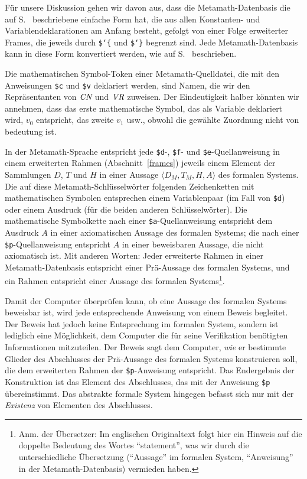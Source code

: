Für unsere Diskussion gehen wir davon aus, dass die Metamath-Datenbasis die auf S.~\pageref{framelist} beschriebene einfache Form hat, die aus allen Konstanten- und Variablendeklarationen am Anfang besteht, gefolgt von einer Folge erweiterter Frames, die jeweils durch \texttt{\$\char`\{} und \texttt{\$\char`\}} begrenzt sind.  Jede Metamath-Datenbasis kann in diese Form konvertiert werden, wie auf S.~\pageref{frameconvert} beschrieben. 

Die mathematischen Symbol-Token einer Metamath-Quelldatei, die mit den Anweisungen \texttt{\$c} und \texttt{\$v} deklariert werden, sind Namen, die wir den Repräsentanten von $\mbox{\em CN}$ und $\mbox{\em VR}$ zuweisen.  Der Eindeutigkeit halber könnten wir annehmen, dass das erste mathematische Symbol, das als Variable deklariert wird, $v_0$ entspricht, das zweite $v_1$ usw., obwohl die gewählte Zuordnung nicht von bedeutung ist. 

In der Metamath-Sprache entspricht jede \texttt{\$d}-, \texttt{\$f}- und \texttt{\$e}-Quellanweisung in einem erweiterten Rahmen (Abschnitt~\ref{frames}) jeweils einem Element der Sammlungen $D$, $T$ und $H$ in einer Aussage  $\langle D_M,T_M,H,A\rangle$ des formalen Systems.  Die auf diese Metamath-Schlüsselwörter folgenden Zeichenketten mit mathematischen Symbolen entsprechen einem Variablenpaar (im Fall von \texttt{\$d}) oder einem Ausdruck (für die beiden anderen Schlüsselwörter). Die mathematische Symbolkette nach einer \texttt{\$a}-Quellanweisung entspricht dem Ausdruck $A$ in einer axiomatischen Aussage des formalen Systems; die nach einer \texttt{\$p}-Quellanweisung entspricht $A$ in einer beweisbaren Aussage, die nicht axiomatisch ist.  Mit anderen Worten: Jeder erweiterte Rahmen in einer Metamath-Datenbasis entspricht einer Prä-Aussage des formalen Systems, und ein Rahmen entspricht einer Aussage des formalen Systems\footnote{Anm. der Übersetzer: Im englischen Originaltext folgt hier ein Hinweis auf die doppelte Bedeutung des Wortes "`statement"', was wir durch die unterschiedliche Übersetzung ("`Aussage"' im formalen System, "`Anweisung"' in der Metamath-Datenbasis) vermieden haben.}.  

Damit der Computer überprüfen kann, ob eine Aussage des formalen Systems beweisbar ist, wird jede entsprechende Anweisung von einem Beweis begleitet. Der Beweis hat jedoch keine Entsprechung im formalen System, sondern ist lediglich eine Möglichkeit, dem Computer die für seine Verifikation benötigten Informationen mitzuteilen.  Der Beweis sagt dem Computer, {\em wie} er bestimmte Glieder des Abschlusses der Prä-Aussage des formalen Systems konstruieren soll, die dem erweiterten Rahmen der \texttt{\$p}-Anweisung entspricht.  Das Endergebnis der Konstruktion ist das Element des Abschlusses, das mit der Anweisung \texttt{\$p} übereinstimmt.  Das abstrakte formale System hingegen befasst sich nur mit der {\em Existenz} von Elementen des Abschlusses. 

